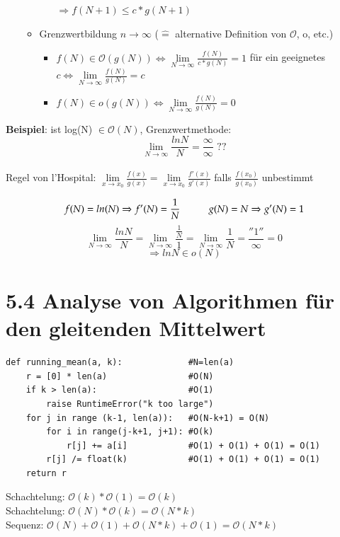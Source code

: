 \documentclass[11pt, fleqn]{scrreprt}
\newcommand{\bigO}[0]{\mathcal{O}}
\begin{document}
\begin{itemize}
\begin{itemize}
\begin{enumerate}
                \hspace*{3cm} $\Rightarrow f(N+1) \leq c*g(N+1)$
            \end{enumerate}
            \item Grenzwertbildung $n \rightarrow \infty$ ($\widehat{=}$ alternative Definition von $\bigO{}$, o, etc.)
            \begin{itemize}[label={}]
                \item $f(N) \in \bigO{}(g(N)) \Leftrightarrow \lim\limits_{N \rightarrow \infty} \frac{f(N)}{c*g(N)} = 1$ für ein geeignetes $c \Leftrightarrow \lim\limits_{N \rightarrow \infty} \frac{f(N)}{g(N)} = c$
                \item $f(N) \in o(g(N)) \Leftrightarrow \lim\limits_{N \rightarrow \infty} \frac{f(N)}{g(N)} = 0$
            \end{itemize}
        \end{itemize}
    \end{itemize}

\textbf{Beispiel}: ist log(N) $\in \bigO{}(N)$, Grenzwertmethode:\\
\[\lim\limits_{N\rightarrow\infty} \frac{ln N}{N} = \frac{\infty}{\infty} \text{ ??} \]\\
Regel von l'Hospital: $\lim\limits_{x \rightarrow x_0} \frac{f(x)}{g(x)} = \lim\limits_{x \rightarrow x_0} \frac{f'(x)}{g'(x)}$ falls $\frac{f(x_0)}{g(x_0)}$ unbestimmt

\[f(N) = ln(N) \Rightarrow f'(N) = \frac{1}{N} \hspace*{1cm} g(N) = N \Rightarrow g'(N) = 1 \]
\[\lim_{N \rightarrow \infty} \frac{ln N}{N} = \lim_{N \rightarrow \infty} \frac{\frac{1}{N}}{1} = \lim_{N \rightarrow \infty} \frac{1}{N} =  \frac{''1''}{\infty} = 0  \]
\[ \Rightarrow ln N \in o(N) \]

\section*{5.4 Analyse von Algorithmen für den gleitenden Mittelwert}
\begin{verbatim}
def running_mean(a, k):             #N=len(a)
    r = [0] * len(a)                #O(N)
    if k > len(a):                  #O(1)
        raise RuntimeError("k too large")
    for j in range (k-1, len(a)):   #O(N-k+1) = O(N)
        for i in range(j-k+1, j+1): #O(k)
            r[j] += a[i]            #O(1) + O(1) + O(1) = O(1)
        r[j] /= float(k)            #O(1) + O(1) + O(1) = O(1)
    return r
\end{verbatim}
Schachtelung: $\bigO{}(k) * \bigO{}(1) = \bigO{}(k)$ \\
Schachtelung: $\bigO{}(N) * \bigO{}(k) = \bigO{}(N*k)$ \\
Sequenz:      $\bigO{}(N)+\bigO{}(1)+\bigO{}(N*k)+\bigO{}(1) = \bigO{}(N*k)$ \\
\end{document}
